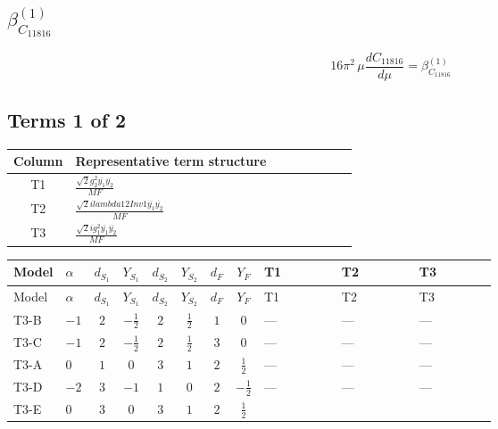 \documentclass[8pt]{article}
\begin{document}
\begin{landscape}
\section*{$\beta_{C_{11816}}^{(1)}$}
\[16\pi^2\,\mu\frac{d C_{11816}}{d\mu}=\beta_{C_{11816}}^{(1)}\]
\subsection*{Terms 1 of 2}
\begin{center}
\begin{tabular}{@{}c >{\raggedright\arraybackslash}p{0.82\linewidth}@{}}
\toprule
Column & Representative term structure \\
\midrule
T1 & \(\displaystyle \frac{\sqrt{2} g_{2}^{2} \overline{y_{1}} \overline{y_{2}}}{MF}\) \\
\midrule
T2 & \(\displaystyle \frac{\sqrt{2} i lambda12Inv1 \overline{y_{1}} \overline{y_{2}}}{MF}\) \\
\midrule
T3 & \(\displaystyle \frac{\sqrt{2} i g_{1}^{2} \overline{y_{1}} \overline{y_{2}}}{MF}\) \\
\midrule
\bottomrule
\end{tabular}
\end{center}
\smallskip
\tiny
\begin{longtable}{@{}llcccccc >{\raggedright\arraybackslash}p{0.21\linewidth} >{\raggedright\arraybackslash}p{0.21\linewidth} >{\raggedright\arraybackslash}p{0.21\linewidth}@{}}
\toprule
Model & $\alpha$ & $d_{S_1}$ & $Y_{S_1}$ & $d_{S_2}$ & $Y_{S_2}$ & $d_F$ & $Y_F$ & T1 & T2 & T3 \\
\midrule
\endfirsthead
\toprule
Model & $\alpha$ & $d_{S_1}$ & $Y_{S_1}$ & $d_{S_2}$ & $Y_{S_2}$ & $d_F$ & $Y_F$ & T1 & T2 & T3 \\
\midrule
\endhead
T3-B & $-1$ & $2$ & $-\frac{1}{2}$ & $2$ & $\frac{1}{2}$ & $1$ & $0$ & --- & --- & --- \\
\midrule
T3-C & $-1$ & $2$ & $-\frac{1}{2}$ & $2$ & $\frac{1}{2}$ & $3$ & $0$ & --- & --- & --- \\
\midrule
T3-A & $0$ & $1$ & $0$ & $3$ & $1$ & $2$ & $\frac{1}{2}$ & --- & --- & --- \\
\midrule
T3-D & $-2$ & $3$ & $-1$ & $1$ & $0$ & $2$ & $-\frac{1}{2}$ & --- & --- & --- \\
\midrule
T3-E & $0$ & $3$ & $0$ & $3$ & $1$ & $2$ & $\frac{1}{2}$ & \scriptsize\adjustbox{max width=\linewidth}{$\begin{gathered} \frac{\sqrt{2} g_{2}^{2} \overline{y_{1}} \overline{y_{2}}}{4 MF}\end{gathered}$} & \scriptsize\adjustbox{max width=\linewidth}{$\begin{gathered} - \frac{\sqrt{2} i lambda12Inv1 \overline{y_{1}} \overline{y_{2}}}{4 MF}\end{gathered}$} & \scriptsize\adjustbox{max width=\linewidth}{$\begin{gathered} \frac{3 \sqrt{2} i g_{1}^{2} \overline{y_{1}} \overline{y_{2}}}{16 MF}\end{gathered}$} \\
\midrule
\bottomrule
\end{longtable}
\clearpage

\end{landscape}
\end{document}
